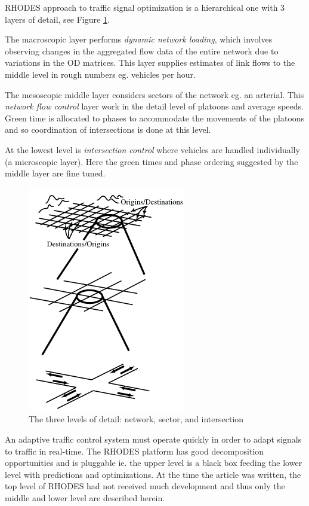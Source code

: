 \label{sec:rhodes}

RHODES approach to traffic signal optimization is a hierarchical one
with 3 layers of detail, see Figure \ref{fig:rhodes_hierarchi}.

The macroscopic layer performs \textit{dynamic network loading}, which
involves observing changes in the aggregated flow data of the entire
network due to variations in the OD matrices. This layer supplies
estimates of link flows to the middle level in rough numbers
eg. vehicles per hour.

The mesoscopic middle layer considers sectors of the network eg. an
arterial. This \textit{network flow control} layer work in the detail
level of platoons and average speeds. Green time is allocated to
phases to accommodate the movements of the platoons and so
coordination of intersections is done at this level.

At the lowest level is \textit{intersection control} where vehicles
are handled individually (a microscopic layer). Here the green times
and phase ordering suggested by the middle layer are fine tuned.

\begin{figure}[!ht]
\begin{center}
\includegraphics[scale=0.5]{rhodes_hierachy.png} 
\end{center}
\caption{The three levels of detail: network, sector, and intersection}
\label{fig:rhodes_hierarchi}
\end{figure}

An adaptive traffic control system must operate quickly in order to
adapt signals to traffic in real-time. The RHODES platform has good
decomposition opportunities and is pluggable ie. the upper level is a
black box feeding the lower level with predictions and
optimizations. At the time the article was written, the top level of
RHODES had not received much development and thus only the middle and
lower level are described herein.

